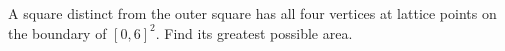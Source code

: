 A square distinct from the outer square has all four vertices at lattice points on the boundary of $[0,6]^2 $. Find its greatest possible area.

